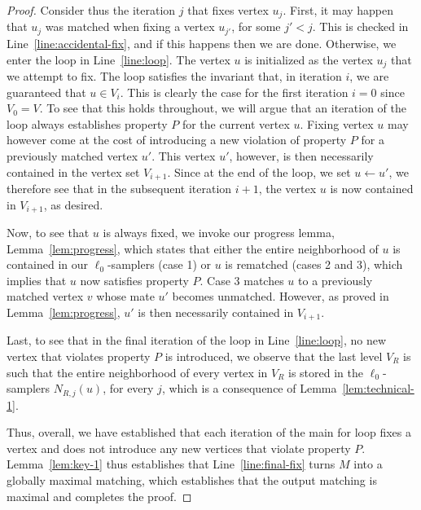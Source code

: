 \documentclass[11pt,a4paper]{article}
\begin{document}
\begin{proof}
    Consider thus the iteration $j$ that fixes vertex $u_j$. First, it may happen that $u_j$ was matched when fixing a vertex $u_{j'}$, for some $j' < j$. This is checked in Line~\ref{line:accidental-fix}, and if this happens then we are done. Otherwise, we enter the loop in Line~\ref{line:loop}. The vertex $u$ is initialized as the vertex $u_j$ that we attempt to fix. The loop satisfies the invariant that, in iteration $i$, we are guaranteed that $u \in V_i$. This is clearly the case for the first iteration $i=0$ since $V_0 = V$. To see that this holds throughout, we will argue that an iteration of the loop always establishes property $P$ for the current vertex $u$. Fixing vertex $u$ may however come at the cost of introducing a new violation of property $P$ for a previously matched vertex $u'$. This vertex $u'$, however, is then necessarily  contained in the vertex set $V_{i+1}$. Since at the end of the loop, we set $u \gets u'$, we therefore see that in the subsequent iteration $i+1$, the vertex $u$ is now contained in $V_{i+1}$, as desired. 

    Now, to see that $u$ is always fixed, we invoke our progress lemma, Lemma~\ref{lem:progress}, which states that either the entire neighborhood of $u$ is contained in our $\ell_0$-samplers (case 1) or $u$ is rematched (cases 2 and 3), which implies that $u$ now satisfies property $P$. Case 3 matches $u$ to a previously matched vertex $v$ whose mate $u'$ becomes unmatched. However, as proved in Lemma~\ref{lem:progress}, $u'$ is then necessarily contained in $V_{i+1}$. 

    Last, to see that in the final iteration of the loop in Line~\ref{line:loop}, no new vertex that violates property $P$ is introduced, we observe that the last level $V_R$ is such that the entire neighborhood of every vertex in $V_R$ is stored in the $\ell_0$-samplers $N_{R,j}(u)$, for every $j$, which is a consequence of Lemma~\ref{lem:technical-1}.

    Thus, overall, we have established that each iteration of the main for loop fixes a vertex and does not introduce any new vertices that violate property $P$. Lemma~\ref{lem:key-1} thus establishes that Line~\ref{line:final-fix} turns $M$ into a globally maximal matching, which establishes that the output matching is maximal and completes the proof.

    
    


\end{proof}
\end{document}
